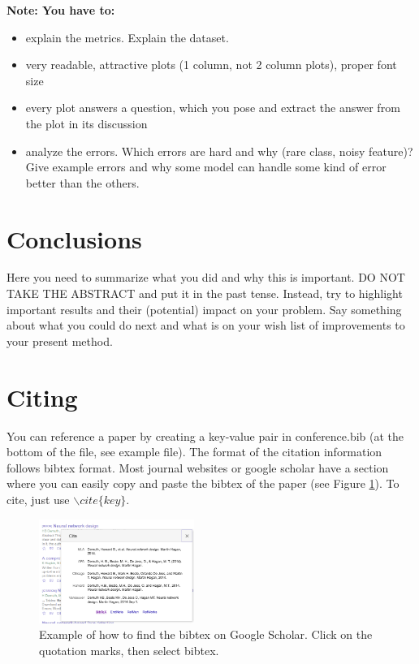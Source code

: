 \documentclass{article}
\begin{document}
{\bf Note: You have to:}
\begin{itemize}
\item explain the metrics. Explain the dataset.
\item very readable, attractive plots (1 column, not 2 column plots),
proper font size
\item every plot answers a question, which you pose and extract the
answer from the plot in its discussion
\item analyze the errors. Which errors are hard and why (rare class, noisy feature)? Give example errors and why some model can handle some kind of error better than the others.
\end{itemize}

\section{Conclusions}
\label{sec:conclusion}

Here you need to summarize what you did and why this is important.  DO
NOT TAKE THE ABSTRACT and put it in the past tense. Instead, try to
highlight important results and their (potential) impact on your
problem. Say something about what you could do next and what is on
your wish list of improvements to your present method.


\section{Citing}
\label{sec:cite}

You can reference a paper by creating a key-value pair in conference.bib (at the bottom of the file, see example file). The format of the citation information follows bibtex format. Most journal websites or google scholar have a section where you can easily copy and paste the bibtex of the paper (see Figure \ref{fig:bibtex}). To cite, just use $\backslash cite\{key\}$. 

\begin{figure}
  \centering
  \centerline{\includegraphics[width=0.45\textwidth]{bibtex.png}}
  \caption{Example of how to find the bibtex on Google Scholar. Click on the quotation marks, then select bibtex.}
  \label{fig:bibtex}
\end{figure}
\end{document}
